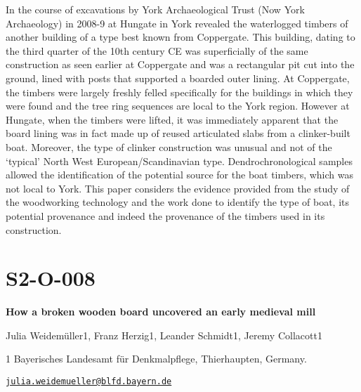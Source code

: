 \documentclass[
]{book}
\begin{document}
In the course of excavations by York Archaeological Trust (Now York Archaeology) in 2008-9 at Hungate in York revealed the waterlogged timbers of another building of a type best known from Coppergate. This building, dating to the third quarter of the 10th century CE was superficially of the same construction as seen earlier at Coppergate and was a rectangular pit cut into the ground, lined with posts that supported a boarded outer lining. At Coppergate, the timbers were largely freshly felled specifically for the buildings in which they were found and the tree ring sequences are local to the York region. However at Hungate, when the timbers were lifted, it was immediately apparent that the board lining was in fact made up of reused articulated slabs from a clinker-built boat. Moreover, the type of clinker construction was unusual and not of the `typical' North West European/Scandinavian type. Dendrochronological samples allowed the identification of the potential source for the boat timbers, which was not local to York. This paper considers the evidence provided from the study of the woodworking technology and the work done to identify the type of boat, its potential provenance and indeed the provenance of the timbers used in its construction.

\hypertarget{s2-o-008}{%
\section*{S2-O-008}\label{s2-o-008}}

\textbf{How a broken wooden board uncovered an early medieval mill}

Julia Weidemüller1, Franz Herzig1, Leander Schmidt1, Jeremy Collacott1

1 Bayerisches Landesamt für Denkmalpflege, Thierhaupten, Germany.

\href{mailto:julia.weidemueller@blfd.bayern.de}{\nolinkurl{julia.weidemueller@blfd.bayern.de}}
\end{document}
